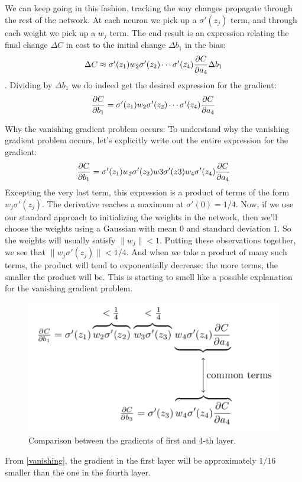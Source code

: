 {We can keep going in this fashion, tracking the way changes propagate through the rest of the network. At each neuron we pick up a $\sigma'(z_j)$ term, and through each weight we pick up a $w_j$ term. The end result is an expression relating the final change $\Delta C$
 in cost to the initial change $\Delta b_1$ in the bias:
\begin{equation}
\Delta C\approx\sigma'(z_1)w_2\sigma'(z_2)\cdots\sigma'(z_4)\frac{\mathrm{\partial} C}{\mathrm{\partial} a_4}\Delta b_1
\end{equation}. 
Dividing by $\Delta b_1$ we do indeed get the desired expression for the gradient:
\begin{equation}
\frac{\mathrm{\partial} C}{\mathrm{\partial} b_1}=\sigma'(z_1)w_2\sigma'(z_2)\cdots\sigma'(z_4)\frac{\mathrm{\partial} C}{\mathrm{\partial} a_4}
\end{equation}

Why the vanishing gradient problem occurs: To understand why the vanishing gradient problem occurs, let's explicitly write out the entire expression for the gradient:
\begin{equation}
\frac{\mathrm{\partial} C}{\mathrm{\partial} b_1}=\sigma'(z_1)w_2\sigma'(z_2)w3\sigma'(z3)w_4\sigma'(z_4)\frac{\mathrm{\partial} C}{\mathrm{\partial} a_4}
\end{equation} 
Excepting the very last term, this expression is a product of terms of the form $w_j\sigma'(z_j)$. The derivative reaches a maximum at $\sigma'(0)=1/4$.  Now, if we use our standard approach to initializing the weights in the network, then we'll choose the weights using a Gaussian with mean $0$ and standard deviation $1$. So the weights will usually satisfy $\|w_j\|<1$. Putting these observations together, we see that $\|w_j \sigma'(z_j)\|<1/4$. And when we take a product of many such terms, the product will tend to exponentially decrease: the more terms, the smaller the product will be. This is starting to smell like a possible explanation for the vanishing gradient problem.
\begin{figure}
\centering
\includegraphics[scale=0.5]{img/vanishinggradient}
\caption{Comparison between the gradients of first and 4-th layer.}
\label{vanishing}
\end{figure}
From \autoref{vanishing}, the gradient in the first layer will be approximately $1/16$ smaller than the one in the fourth layer.

}
